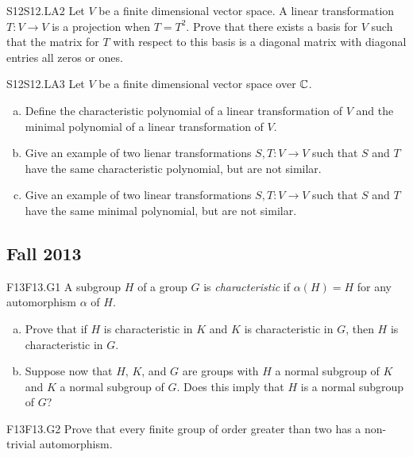 \documentclass[../AlgebraQualSolutions.tex]{subfiles}
\begin{document}
	\begin{prob}{S12}{S12.LA2}
		Let $V$ be a finite dimensional vector space. A linear transformation $T: V \to V$ is a projection when $T = T^2$. Prove that there exists a basis for $V$ such that the matrix for $T$ with respect to this basis is a diagonal matrix with diagonal entries all zeros or ones.
	\end{prob}

	\begin{prob}{S12}{S12.LA3}
		Let $V$ be a finite dimensional vector space over $\mathbb{C}$.

		\begin{enumerate}[(a)]
			\item Define the characteristic polynomial of a linear transformation of $V$ and the minimal polynomial of a linear transformation of $V$.
			\item Give an example of two lienar transformations $S,T: V \to V$ such that $S$ and $T$ have the same characteristic polynomial, but are not similar.
			\item Give an example of two linear transformations $S,T: V \to V$ such that $S$ and $T$ have the same minimal polynomial, but are not similar.
		\end{enumerate}
	\end{prob}

	\subsection{Fall 2013}

	\begin{prob}{F13}{F13.G1}
		A subgroup $H$ of a group $G$ is \emph{characteristic} if $\alpha(H) = H$ for any automorphism $\alpha$ of $H$.
		
		\begin{enumerate}[(a)]
			\item Prove that if $H$ is characteristic in $K$ and $K$ is characteristic in $G$, then $H$ is characteristic in $G$.
			\item Suppose now that $H$, $K$, and $G$ are groups with $H$ a normal subgroup of $K$ and $K$ a normal subgroup of $G$. Does this imply that $H$ is a normal subgroup of $G$?
		\end{enumerate}
	\end{prob}

	\begin{prob}{F13}{F13.G2}
		Prove that every finite group of order greater than two has a non-trivial automorphism.
	\end{prob}
\end{document}
